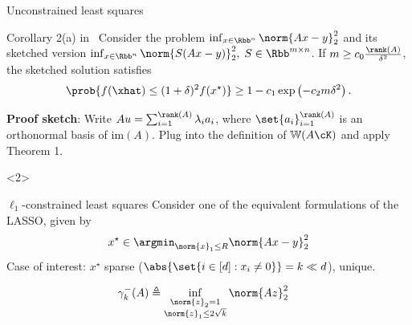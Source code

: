 \documentclass[10pt]{beamer}
\newcommand{\xstar}{x^{\star}}
\begin{document}
\begin{frame}{Unconstrained least squares}
    \begin{block}{Corollary 2(a) in~\cite{PilWain15}}
        Consider the problem $\inf_{x \in \Rbb^n} \norm{Ax - y}_2^2$ and its
        sketched version $\inf_{x \in \Rbb^n} \norm{S(Ax - y)}_2^2, \;
        S \in \Rbb^{m \times n}$. If $m \geq c_0 \frac{\rank(A)}{\delta^2}$, the
        sketched solution satisfies
        \[
            \prob{f(\xhat) \leq (1 + \delta)^2 f(\xstar)}
            \geq 1 - c_1 \exp\left(-c_2 m \delta^2\right).
        \]
    \end{block}
    \vspace{1em}

    \textbf{Proof sketch}:
        Write $Au = \sum_{i=1}^{\rank(A)} \lambda_i a_i$, where
        $\set{a_i}_{i=1}^{\rank(A)}$ is an orthonormal basis of
        $\mathrm{im}(A)$. Plug into the definition of $\mathbb{W}(A \cK)$
        and apply Theorem 1.

    \vspace{1em}

    <2>
\end{frame}


\begin{frame}{$\ell_1$-constrained least squares}
    Consider one of the equivalent formulations of the LASSO, given by
    \[
        \xstar \in \argmin_{\norm{x}_1 \leq R} \norm{Ax - y}_2^2
    \]
    Case of interest: $\xstar$ sparse ($\abs{\set{i \in [d]: x_i \neq 0}} = k
    \ll
    d$),
    unique.
    \vspace{1em}
    \begin{center}
        \begin{tcolorbox}[colback=cred!20, colframe=cred,
            title={\textbf{Key quantity}: $\ell_1$-restricted eigenvalue},
            boxrule=0.2mm, width=(0.75 \linewidth)]
        \begin{align}
            \begin{aligned}
                \gamma_k^-(A) & \triangleq
                    \inf_{\substack{\norm{z}_2 = 1 \\ \norm{z}_1 \leq 2
                    \sqrt{k}}} \norm{Az}_2^2
            \end{aligned}
            \label{eq:ell_1_eigs}
        \end{align}
        \end{tcolorbox}
    \end{center}
\end{frame}
\end{document}
